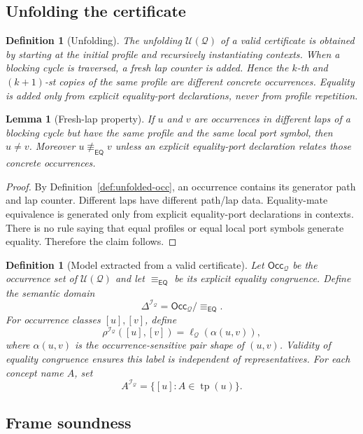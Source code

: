 \documentclass[11pt]{article}
\newtheorem{lemma}[theorem]{Lemma}
\newtheorem{definition}[theorem]{Definition}
\newcommand{\EQ}{\mathsf{EQ}}
\newcommand{\I}{\mathcal I}
\newcommand{\Q}{\mathcal Q}
\newcommand{\U}{\mathcal U}
\newcommand{\Occ}{\mathsf{Occ}}
\newcommand{\typ}{\operatorname{tp}}
\newcommand{\eqc}{\equiv_{\EQ}}
\begin{document}
\subsection{Unfolding the certificate}

\begin{definition}[Unfolding]\label{def:unfolding}
The unfolding $\U(\Q)$ of a valid certificate is obtained by starting at the initial profile and recursively instantiating contexts.  When a blocking cycle is traversed, a fresh lap counter is added.  Hence the $k$-th and $(k+1)$-st copies of the same profile are different concrete occurrences.  Equality is added only from explicit equality-port declarations, never from profile repetition.
\end{definition}

\begin{lemma}[Fresh-lap property]\label{lem:fresh-lap}
If $u$ and $v$ are occurrences in different laps of a blocking cycle but have the same profile and the same local port symbol, then $u\ne v$.  Moreover $u\not\eqc v$ unless an explicit equality-port declaration relates those concrete occurrences.
\end{lemma}

\begin{proof}
By Definition~\ref{def:unfolded-occ}, an occurrence contains its generator path and lap counter.  Different laps have different path/lap data.  Equality-mate equivalence is generated only from explicit equality-port declarations in contexts.  There is no rule saying that equal profiles or equal local port symbols generate equality.  Therefore the claim follows.
\end{proof}

\begin{definition}[Model extracted from a valid certificate]\label{def:model-from-cert}
Let $\Occ_\Q$ be the occurrence set of $\U(\Q)$ and let $\eqc$ be its explicit equality congruence.  Define the semantic domain
\[
   \Delta^{\I_\Q}=\Occ_\Q/{\eqc}.
\]
For occurrence classes $[u],[v]$, define
\[
   \rho^{\I_\Q}([u],[v])=\ell_\Q(\alpha(u,v)),
\]
where $\alpha(u,v)$ is the occurrence-sensitive pair shape of $(u,v)$.  Validity of equality congruence ensures this label is independent of representatives.  For each concept name $A$, set
\[
   A^{\I_\Q}=\{[u]:A\in\typ(u)\}.
\]
\end{definition}

\subsection{Frame soundness}
\end{document}
